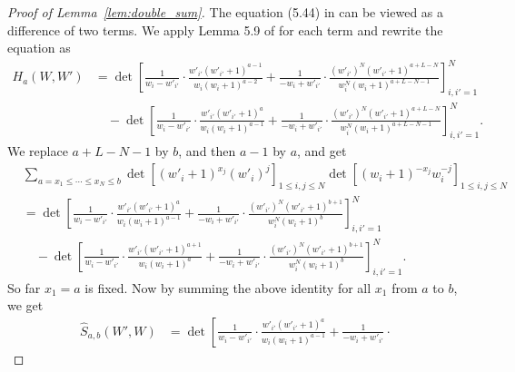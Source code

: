 \documentclass{article}
\numberwithin{equation}{section}
\begin{document}
\begin{proof}[Proof of Lemma~\ref{lem:double_sum}]
	The equation (5.44) in \cite{Baik-Liu17} can be viewed as a difference of two terms. We apply Lemma 5.9 of \cite{Baik-Liu17} for each term and rewrite the equation as
	\begin{equation*}
		\begin{split}
			H_a(W,W')&= \det\left[
			                     \frac{1}{w_i-w'_{i'}}
			                     \cdot
			                     \frac{w'_{i'} (w'_{i'}+1)^{a-1}}{w_i (w_i+1)^{a-2}}
			                    +\frac{1}{-w_i+w'_{i'}}
			                     \cdot
			                     \frac{(w'_{i'})^N (w'_{i'}+1)^{a+L-N}}
			                          {w_i^N (w_i+1)^{a+L-N-1}}
			                \right]_{i,i'=1}^N\\
			      &\quad -\det\left[
			                 \frac{1}{w_i-w'_{i'}}
			                 \cdot
			                 \frac{w'_{i'} (w'_{i'}+1)^{a}}{w_i (w_i+1)^{a-1}}
			                 +\frac{1}{-w_i+w'_{i'}}
			                 \cdot
			                 \frac{(w'_{i'})^N (w'_{i'}+1)^{a+L-N}}
			                      {w_i^N (w_i+1)^{a+L-N-1}}
			                \right]_{i,i'=1}^N.
		\end{split}
	\end{equation*}
We replace $a+L-N-1$ by $b$, and then $a-1$ by $a$, and get
\begin{equation*}
	\begin{split}
		&\sum_{a= x_1\le\cdots\le x_N\le b} 
		   \det\left[ (w'_i+1)^{x_j} (w'_i)^j\right]_{1\le i,j\le N}
		   \det\left[ (w_i+1)^{-x_j} w_i^{-j}\right]_{1\le i,j\le N}\\
		&= \det\left[
		\frac{1}{w_i-w'_{i'}}
		\cdot
		\frac{w'_{i'} (w'_{i'}+1)^{a}}{w_i (w_i+1)^{a-1}}
		+\frac{1}{-w_i+w'_{i'}}
		\cdot
		\frac{(w'_{i'})^N (w'_{i'}+1)^{b+1}}
		{w_i^N (w_i+1)^{b}}
		\right]_{i,i'=1}^N\\
		&\quad -\det\left[
		\frac{1}{w_i-w'_{i'}}
		\cdot
		\frac{w'_{i'} (w'_{i'}+1)^{a+1}}{w_i (w_i+1)^{a}}
		+\frac{1}{-w_i+w'_{i'}}
		\cdot
		\frac{(w'_{i'})^N (w'_{i'}+1)^{b+1}}
		{w_i^N (w_i+1)^{b}}
		\right]_{i,i'=1}^N.  
	\end{split}
\end{equation*}
So far $x_1=a$ is fixed. Now by summing the above identity for all $x_1$ from $a$ to $b$, we get
\begin{equation*}
	\begin{split}
		\hat S_{a,b}(W',W)
		&=\det\left[
		        \frac{1}{w_i-w'_{i'}}
		        \cdot
	         	\frac{w'_{i'} (w'_{i'}+1)^{a}}{w_i (w_i+1)^{a-1}}
	          + \frac{1}{-w_i+w'_{i'}}
		        \cdot

\end{split}
\end{equation*}
\end{proof}
\end{document}
